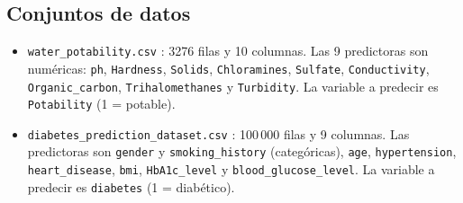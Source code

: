 \documentclass[11pt,a4paper]{article}
\let\citepOriginal\citep
\renewcommand*{\citep}[1]{\textbf{\citepOriginal{#1}}}%
\begin{document}
\subsection{Conjuntos de datos}
\begin{itemize}
  \item \texttt{water\_potability.csv} \citep{kadiwal2021}: 3276 filas y 10 columnas. Las 9 predictoras son numéricas: \texttt{ph}, \texttt{Hardness}, \texttt{Solids}, \texttt{Chloramines}, \texttt{Sulfate}, \texttt{Conductivity}, \texttt{Organic\_carbon}, \texttt{Trihalomethanes} y \texttt{Turbidity}. La variable a predecir es \texttt{Potability} (1 = potable).
  \item \texttt{diabetes\_prediction\_dataset.csv} \citep{mustafa2023}: 100\,000 filas y 9 columnas. Las predictoras son \texttt{gender} y \texttt{smoking\_history} (categóricas), \texttt{age}, \texttt{hypertension}, \texttt{heart\_disease}, \texttt{bmi}, \texttt{HbA1c\_level} y \texttt{blood\_glucose\_level}. La variable a predecir es \texttt{diabetes} (1 = diabético).
\end{itemize}
\end{document}
